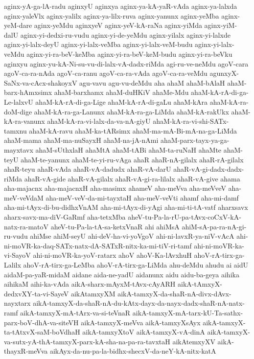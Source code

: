 {aginx-yA-ga-lA-radu
aginxyU
aginxya
aginx-ya-kA-yaR-vAda
aginx-ya-lalxda
aginx-yaleVlx
aginx-yalilx
aginx-ya-lilx-ruva
aginx-yanunx
aginx-yeMba
aginx-yeM-dare
aginx-yeMdu
aginxyeV
aginx-yeV-kA-raNa
aginx-yiMda
aginx-yiM-dalU
aginx-yi-dedxi-ru-vudu
aginx-yi-de-yeMdu
aginx-yilalx
aginx-yi-lalxde
aginx-yi-lalx-deyU
aginx-yi-lalx-veMba
aginx-yi-lalx-veM-budu
aginx-yi-lalx-veMdu
aginx-yi-ra-beV-keMba
aginx-yi-ra-beV-keM-budu
aginx-yi-ra-beVku
aginxyu
aginx-yu-kA-Ni-su-vu-di-lalx-vA-dadx-riMda
agi-ru-ve-neMdu
agoV-cara
agoV-ca-ra-nAda
agoV-ca-ranu
agoV-ca-ra-vAda
agoV-ca-ra-veMdu
agunxyX-SaNx-va-cAcx-shakoyxV
agu-vavu
agu-vu-deMdu
aha
ahaM
ahaM-bAlaH
ahaM-barx-hAmxsimx
ahaM-barxhamx
ahaM-duHKiV
ahaMe-Mdu
ahaM-kA-rA-di-ga-Le-lalxvU
ahaM-kA-rA-di-ga-Lige
ahaM-kA-rA-di-gaLu
ahaM-kAra
ahaM-kA-ra-doM-dige
ahaM-kA-ra-ga-Lanunx
ahaM-kA-ra-ga-LiMda
ahaM-kA-rakUkx
ahaM-kA-ra-vanunx
ahaM-kA-ra-vi-lalx-da-va-nA-giyU
ahaM-kA-ra-vi-shi-SATx-tamxnu
ahaM-kA-ravu
ahaM-ka-tARsimx
ahaM-ma-mA-Bi-mA-na-ga-LiMda
ahaM-mama
ahaM-ma-nuSayxH
ahaM-na-jA-nAmi
ahaM-parx-tayx-ya-ga-mayxtavx
ahaM-sUthxlaH
ahaMtA
ahaM-tABi
ahaM-ta-ruNaH
ahaMte
ahaM-teyU
ahaM-te-yanunx
ahaM-te-yi-ru-vAga
ahaR
ahaR-nA-gilalx
ahaR-rA-gilalx
ahaR-teyu
ahaR-vAda
ahaR-vA-dadudx
ahaR-vA-darU
ahaR-vA-gi-dadx-dadx-riMda
ahaR-vA-gide
ahaR-vA-gilalx
ahaR-vA-gi-ra-lilalx
ahaR-vA-give
ahama
aha-majacnx
aha-majacnxH
aha-masimx
ahameV
aha-meVva
aha-meVveV
aha-meV-veVdaM
aha-meV-veV-da-mi-tayxtaH
aha-meV-veVti
ahamf
aha-mi-damf
aha-mi-tAyx-di-bu-didhxVnAM
aha-mi-tAyx-di-yAgi
aha-mi-ti-tA-vatf
aharxsavx
aharx-savx-ma-diV-GaRmf
aha-tetxMba
aheV-tu-Pa-la-rU-pa-tAvx-coCxV-kA-natx-ra-matoV
aheV-tu-Pa-la-tA-sa-ketxVnaR
ahi
ahiMsA
ahiM-sA-pa-ra-nA-gi-ru-vudu
ahiMse
ahiM-seyU
ahi-deV-ha-vi-yoVgoV
ahi-ni-lavxR-ya-niV-vAcA
ahi-ni-moVR-ka-daq-SATx-natx-dA-SATxR-nitx-ka-mi-tiV-ri-tamf
ahi-ni-moVR-ka-vi-SayoV
ahi-ni-moVR-ka-yoV-ratarx
ahoV
ahoV-Ka-lAvxhuH
ahoV-rA-tirx-ga-Lalilx
ahoV-rA-tirx-ga-LeMba
ahoV-rA-tirx-ga-LiMda
ahu-deMdu
ahudu
ai
aidU
aidaM-pa-yaR-midaM
aidane
aida-ne-yadU
aidanunx
aidu
aidu-ba-geya
aihika
aihikaM
aihi-ka-vAda
aikA-sharx-mAyxM-tAvx-cAyARH
aikA-tAmxyX-dedxvXY-ta-vi-SayeV
aikAtamxyXM
aikA-tamxyX-da-shaR-nA-divx-dAvx-nayxtarx
aikA-tamxyX-da-shaR-nA-du-kAtx-dayx-da-nayx-dadx-shaR-nA-natx-ramf
aikA-tamxyX-mA-tArx-va-si-teVnaR
aikA-tamxyX-mA-tarx-kU-Ta-sathx-parx-boV-dhA-va-siteVH
aikA-tamxyX-meVva
aikA-tamxyXsAyx
aikA-tamxyX-ta-tAtxvX-saM-boVdhaH
aikA-tamxyXtoV
aikA-tamxyX-vA-dinA
aikA-tamxyX-va-sutx-yA-thA-tamxyX-parx-kA-sha-na-pa-ra-tavxtaH
aikAtemxyXV
aikA-thayxR-meVva
aikAyx-da-nu-pa-la-bidhx-shecxV-da-neY-kA-nitx-katA
}
